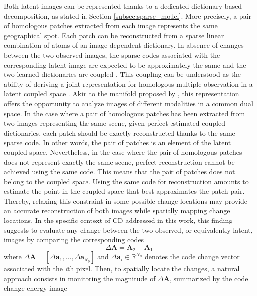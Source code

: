 \documentclass[review]{elsarticle}
\newcommand{\Natom}{N_{\mathrm{d}}}
\newcommand{\Npatch}{N_{\mathrm{p}}}
\begin{document}
Both latent images can be represented thanks to a dedicated dictionary-based decomposition, as stated in Section \ref{subsec:sparse_model}. More precisely, a pair of homologous
patches extracted from each image represents the same geographical spot. Each patch can be reconstructed from a sparse linear combination of atoms of an image-dependent dictionary. In absence of changes between the two observed images, the sparse codes associated with the corresponding latent image are expected to be approximately the same and the two learned dictionaries are coupled \citep{yang_image_2010,yang_coupled_2012,zeyde_single_2010}. This coupling can be understood as the ability of deriving a joint representation for homologous multiple observation in a latent coupled space \citep{gong_coupled_2016}. Akin to the manifold proposed by \citet{prendes_new_2015}, this representation offers the opportunity to analyze images of different modalities in a common dual space. In the case where a pair of homologous patches has been extracted from two images representing the same scene, given perfect estimated coupled dictionaries, each patch should be exactly reconstructed thanks to the same sparse code. In other words, the pair of patches is an element of the latent coupled space.  Nevertheless, in the case where the pair of homologous patches does not represent exactly the same scene, perfect reconstruction cannot be achieved using the same code. This means that the pair of patches does not belong to the coupled space. Using the same code for reconstruction amounts to estimate the point in the coupled space that best approximates the patch pair. Thereby, relaxing this constraint in some possible change locations may provide an accurate reconstruction of both images while
spatially mapping change locations. In the specific context of CD addressed in this work, this finding suggests to evaluate any change between the two observed, or equivalently latent, images by comparing the corresponding codes
\begin{equation}
\label{eq:code_relaxation}
	\Delta\mathbf{A} = \mathbf{A}_{2} - \mathbf{A}_{1}
\end{equation}
where $\Delta\mathbf{A}=\left[\Delta\mathbf{a}_1,\ldots,\Delta\mathbf{a}_{\Npatch} \right] $ and $\Delta\mathbf{a}_{i} \in \mathbb{R}^{\Natom}$ denotes the code change vector associated with the \textit{i}th pixel. Then, to spatially locate the changes, a natural approach consists in monitoring the magnitude of $\Delta\mathbf{A}$, summarized by the code change energy image \citep{bovolo_theoretical_2007,ferraris_robust_2017}
\end{document}
